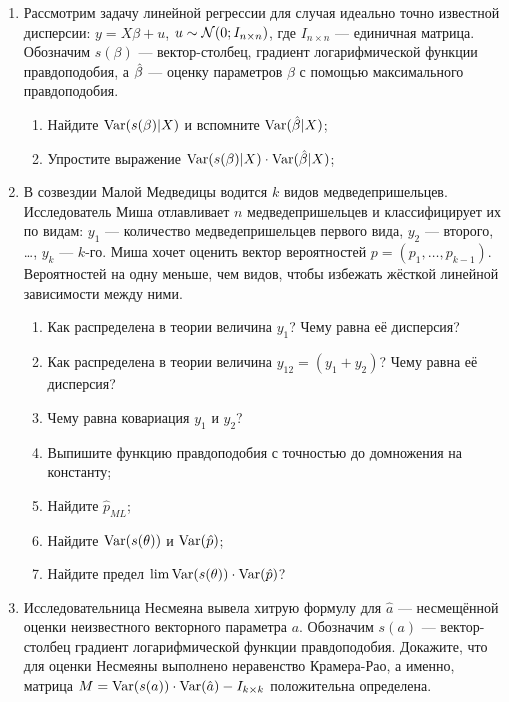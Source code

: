 \begin{enumerate}

  \item Рассмотрим задачу линейной регрессии для случая идеально точно известной дисперсии: $y=X\beta + u$, $u\sim \mathcal{N}(0; I_{n\times n})$,
    где $I_{n\times n}$ — единичная матрица.
    Обозначим $s(\beta)$ — вектор-столбец, градиент логарифмической функции правдоподобия,
    а $\hat{\beta}$ — оценку параметров $\beta$ с помощью максимального правдоподобия.

    \begin{enumerate}
      \item Найдите $\operatorname{Var}(s(\beta)|X)$ и вспомните $\operatorname{Var}(\hat\beta|X)$;
      \item Упростите выражение $\operatorname{Var}(s(\beta)|X) \cdot \operatorname{Var}(\hat\beta|X)$;
    \end{enumerate}

  \item В созвездии Малой Медведицы водится $k$ видов медведепришельцев.
    Исследователь Миша отлавливает $n$ медведепришельцев и классифицирует их по видам:
    $y_1$ — количество медведепришельцев первого вида, $y_2$ — второго, \ldots, $y_k$ — $k$-го.
    Миша хочет оценить вектор вероятностей $p=(p_1, \ldots, p_{k-1})$.
    Вероятностей на одну меньше, чем видов, чтобы избежать жёсткой линейной зависимости между ними.
    \begin{enumerate}
      \item Как распределена в теории величина $y_1$? Чему равна её дисперсия?
      \item Как распределена в теории величина $y_{12}=(y_1 + y_2)$? Чему равна её дисперсия?
      \item Чему равна ковариация $y_1$ и $y_2$?
      \item Выпишите функцию правдоподобия с точностью до домножения на константу;
      \item Найдите $\hat p_{ML}$;
      \item Найдите $\operatorname{Var}(s(\theta))$ и $\operatorname{Var}(\hat p)$;
      \item Найдите предел $\lim \operatorname{Var}(s(\theta)) \cdot \operatorname{Var}(\hat p)$?
    \end{enumerate}



  \item Исследовательница Несмеяна вывела хитрую формулу для $\hat a$ — несмещённой оценки неизвестного векторного параметра $a$.
    Обозначим $s(a)$ — вектор-столбец градиент логарифмической функции правдоподобия. Докажите, что для оценки Несмеяны выполнено неравенство Крамера-Рао,
    а именно, матрица $M = \operatorname{Var}(s(a))\cdot \operatorname{Var}(\hat a) - I_{k\times k}$ положительна определена.




\end{enumerate}
